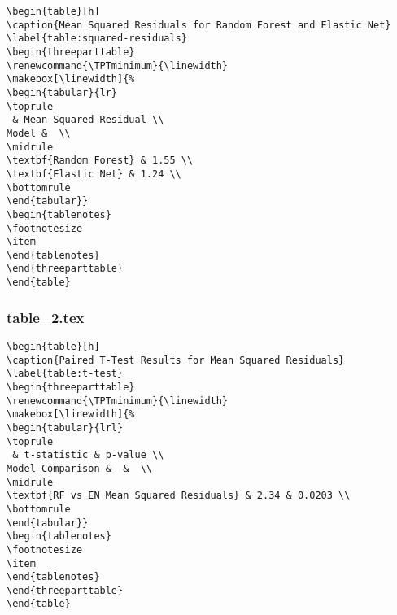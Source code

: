 \documentclass[11pt]{article}
\begin{document}
\begin{Verbatim}[tabsize=4]
\begin{table}[h]
\caption{Mean Squared Residuals for Random Forest and Elastic Net}
\label{table:squared-residuals}
\begin{threeparttable}
\renewcommand{\TPTminimum}{\linewidth}
\makebox[\linewidth]{%
\begin{tabular}{lr}
\toprule
 & Mean Squared Residual \\
Model &  \\
\midrule
\textbf{Random Forest} & 1.55 \\
\textbf{Elastic Net} & 1.24 \\
\bottomrule
\end{tabular}}
\begin{tablenotes}
\footnotesize
\item
\end{tablenotes}
\end{threeparttable}
\end{table}

\end{Verbatim}

\subsubsection*{table\_2.tex}

\begin{Verbatim}[tabsize=4]
\begin{table}[h]
\caption{Paired T-Test Results for Mean Squared Residuals}
\label{table:t-test}
\begin{threeparttable}
\renewcommand{\TPTminimum}{\linewidth}
\makebox[\linewidth]{%
\begin{tabular}{lrl}
\toprule
 & t-statistic & p-value \\
Model Comparison &  &  \\
\midrule
\textbf{RF vs EN Mean Squared Residuals} & 2.34 & 0.0203 \\
\bottomrule
\end{tabular}}
\begin{tablenotes}
\footnotesize
\item
\end{tablenotes}
\end{threeparttable}
\end{table}

\end{Verbatim}
\end{document}
